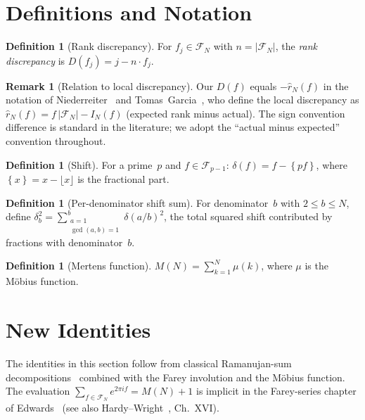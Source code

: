 \documentclass[11pt]{article}
\theoremstyle{definition}
\newtheorem{definition}[theorem]{Definition}
\newtheorem{remark}[theorem]{Remark}
\newcommand{\F}{\mathcal{F}}
\newcommand{\fpart}[1]{\left\{#1\right\}}
\begin{document}
\section{Definitions and Notation}\label{sec:defs}

\begin{definition}[Rank discrepancy]
For $f_j \in \F_N$ with $n = |\F_N|$, the \emph{rank discrepancy} is
$D(f_j) = j - n \cdot f_j$.
\end{definition}

\begin{remark}[Relation to local discrepancy]
Our $D(f)$ equals $-\hat{r}_N(f)$ in the notation of
Niederreiter~\cite{HardyWright2008} and
Tomas~Garcia~\cite{TomasGarcia2025}, who define the local
discrepancy as $\hat{r}_N(f) = f\,|\F_N| - I_N(f)$
(expected rank minus actual).  The sign convention difference
is standard in the literature; we adopt the ``actual minus
expected'' convention throughout.
\end{remark}

\begin{definition}[Shift]
For a prime~$p$ and $f \in \F_{p-1}$:
$\delta(f) = f - \fpart{pf}$,
where $\fpart{x} = x - \lfloor x \rfloor$ is the fractional part.
\end{definition}

\begin{definition}[Per-denominator shift sum]
For denominator~$b$ with $2 \le b \le N$, define
$\delta_b^2 = \sum_{\substack{a=1 \\ \gcd(a,b)=1}}^{b} \delta(a/b)^2$,
the total squared shift contributed by fractions with denominator~$b$.
\end{definition}

\begin{definition}[Mertens function]
$M(N) = \sum_{k=1}^{N} \mu(k)$,
where $\mu$ is the M\"obius function.
\end{definition}


\section{New Identities}\label{sec:identities}

The identities in this section follow from classical
Ramanujan-sum decompositions~\cite{Ramanujan1918, Kanemitsu1982}
combined with the Farey involution and the M\"obius function.
The evaluation $\sum_{f \in \F_N} e^{2\pi i f} = M(N)+1$ is
implicit in the Farey-series chapter of Edwards~\cite{Edwards1974}
(see also Hardy--Wright~\cite{HardyWright2008}, Ch.~XVI\@).
\end{document}
